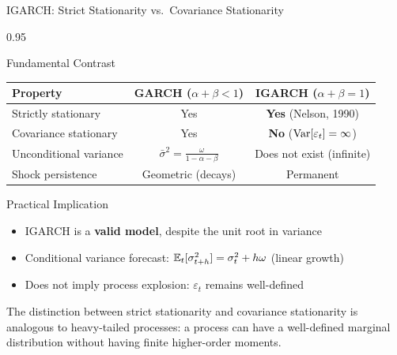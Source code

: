 \documentclass[9pt, aspectratio=169, t]{beamer}
\begin{document}
\begin{frame}{IGARCH: Strict Stationarity vs.\ Covariance Stationarity}
    \begin{cminipage}{0.95\textwidth}
        \vspace{-2mm}
        {\scriptsize
        \begin{block}{Fundamental Contrast}
            \renewcommand{\arraystretch}{1.2}
            \begin{center}
            \begin{tabular}{lcc}
                \toprule
                \textbf{Property} & \textbf{GARCH} ($\alpha + \beta < 1$) & \textbf{IGARCH} ($\alpha + \beta = 1$) \\
                \midrule
                Strictly stationary & Yes & \textbf{Yes} (Nelson, 1990) \\
                Covariance stationary & Yes & \textbf{No} ($\text{Var}[\varepsilon_t] = \infty$) \\
                Unconditional variance & $\bar{\sigma}^2 = \frac{\omega}{1 - \alpha - \beta}$ & Does not exist (infinite) \\
                Shock persistence & Geometric (decays) & Permanent \\
                \bottomrule
            \end{tabular}
            \end{center}
        \end{block}
        \vspace{-1mm}
        \begin{alertblock}{Practical Implication}
            \begin{itemize}\setlength{\itemsep}{0pt}
                \item IGARCH is a \textbf{valid model}, despite the unit root in variance
                \item Conditional variance forecast: $\mathbb{E}_t[\sigma_{t+h}^2] = \sigma_t^2 + h\omega$ (linear growth)
                \item Does not imply process explosion: $\varepsilon_t$ remains well-defined
            \end{itemize}
        \end{alertblock}
        \vspace{-1mm}
        \begin{rmk}
            The distinction between strict stationarity and covariance stationarity is analogous to heavy-tailed processes: a process can have a well-defined marginal distribution without having finite higher-order moments.
        \end{rmk}
        }
    \end{cminipage}
\end{frame}
\end{document}
